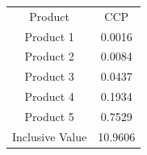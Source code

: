 \begin{tabular}{cc}
Product & CCP \\
Product 1 & 0.0016 \\
Product 2 & 0.0084 \\
Product 3 & 0.0437 \\
Product 4 & 0.1934 \\
Product 5 & 0.7529 \\
Inclusive Value & 10.9606 \\
\end{tabular}